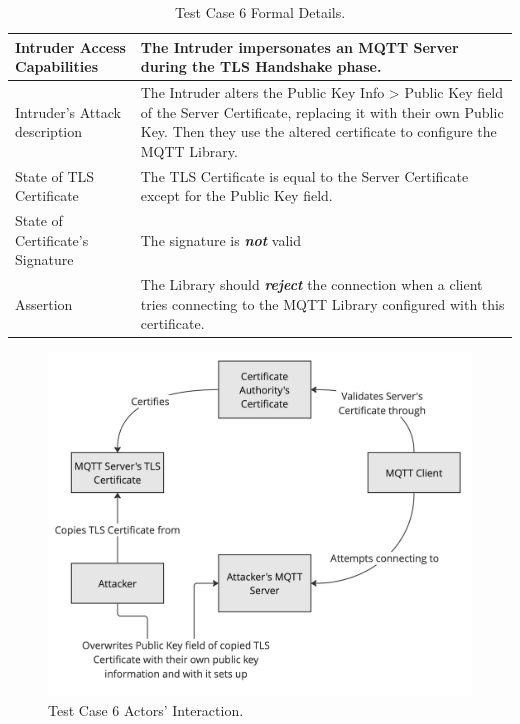 \documentclass[binding=0.6cm,noexaminfo]{sapthesis}
\begin{document}
\begin{table}
\begin{center}
\begin{tabular}{| p{6cm} | p{6cm} |}
\hline
Intruder Access Capabilities & The Intruder impersonates an MQTT Server during the TLS Handshake phase. \\
\hline
Intruder’s Attack description & The Intruder alters the Public Key Info > Public Key field of the Server Certificate, replacing it with their own Public Key. Then they use the altered certificate to configure the MQTT Library. \\
\hline
State of TLS Certificate & The TLS Certificate is equal to the Server Certificate except for the Public Key field. \\
\hline
State of Certificate’s Signature & The signature is \textbf{\textit{not}} valid \\
\hline
Assertion & The Library should \textbf{\textit{reject}} the connection when a client tries connecting to the MQTT Library configured with this certificate. \\
\hline
\end{tabular}
\caption{Test Case 6 Formal Details.}
\label{tab:tc6}
\end{center}
\end{table}

\begin{figure}[htb]
	\includegraphics[width=14cm]{TC6}
	\caption{Test Case 6 Actors' Interaction.}
	\label{fig:tc6}
\end{figure}
\end{document}
